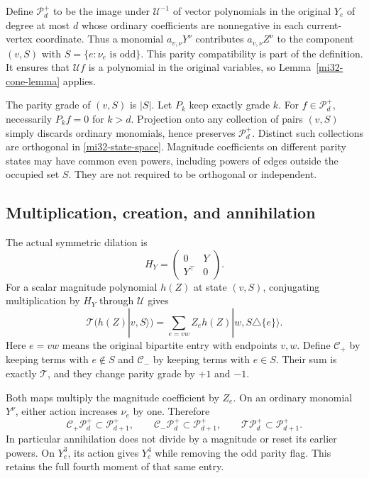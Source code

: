 \documentclass[11pt]{article}
\theoremstyle{definition}
\theoremstyle{remark}
\begin{document}
Define $\mathcal P_d^+$ to be the image under $\mathcal U^{-1}$ of
vector polynomials in the original $Y_e$ of degree at most $d$ whose
ordinary coefficients are nonnegative in each current-vertex coordinate.
Thus a monomial $a_{v,\nu}Y^\nu$ contributes
$a_{v,\nu}Z^\nu$ to the component $(v,S)$ with
$S=\{e:\nu_e\text{ is odd}\}$. This parity compatibility is part
of the definition. It ensures that $\mathcal U f$ is a polynomial in
the original variables, so Lemma~\ref{mi32-cone-lemma} applies.

The parity grade of $(v,S)$ is $|S|$. Let $P_k$ keep exactly grade $k$.
For $f\in\mathcal P_d^+$, necessarily $P_kf=0$ for $k>d$.
Projection onto any collection of pairs $(v,S)$ simply discards
ordinary monomials, hence preserves $\mathcal P_d^+$. Distinct such
collections are orthogonal in \eqref{mi32-state-space}.
Magnitude coefficients on different parity states may have common
even powers, including powers of edges outside the occupied set $S$.
They are not required to be orthogonal or independent.

\subsection{Multiplication, creation, and annihilation}

The actual symmetric dilation is
\begin{equation}\label{mi32-dilation}
 H_Y=\begin{pmatrix}0&Y\\Y^\top&0\end{pmatrix}.
\end{equation}
For a scalar magnitude polynomial $h(Z)$ at state $(v,S)$,
conjugating multiplication by $H_Y$ through $\mathcal U$ gives
\begin{equation}\label{mi32-exact-operator}
 \mathcal T\bigl(h(Z)|v,S\rangle\bigr)
    =\sum_{e=vw}Z_eh(Z)|w,S\triangle\{e\}\rangle.
\end{equation}
Here $e=vw$ means the original bipartite entry with endpoints $v,w$.
Define $\mathcal C_+$ by keeping terms with $e\notin S$ and
$\mathcal C_-$ by keeping terms with $e\in S$. Their sum is exactly
$\mathcal T$, and they change parity grade by $+1$ and $-1$.

Both maps multiply the magnitude coefficient by $Z_e$. On an ordinary
monomial $Y^\nu$, either action increases $\nu_e$ by one. Therefore
\begin{equation}\label{mi32-cone-preservation}
 \mathcal C_+\mathcal P_d^+\subset\mathcal P_{d+1}^+,
 \qquad
 \mathcal C_-\mathcal P_d^+\subset\mathcal P_{d+1}^+,
 \qquad
 \mathcal T\mathcal P_d^+\subset\mathcal P_{d+1}^+.
\end{equation}
In particular annihilation does not divide by a magnitude or reset its
earlier powers. On $Y_e^3$, its action gives $Y_e^4$ while removing the
odd parity flag. This retains the full fourth moment of that same entry.
\end{document}
